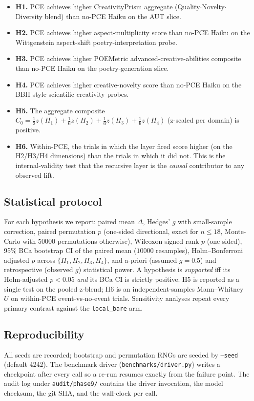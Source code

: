 \begin{itemize}[leftmargin=1.4em]
\item \textbf{H1.} PCE achieves higher CreativityPrism aggregate (Quality$\cdot$Novelty$\cdot$Diversity blend) than no-PCE Haiku on the AUT slice.
\item \textbf{H2.} PCE achieves higher aspect-multiplicity score than no-PCE Haiku on the Wittgenstein aspect-shift poetry-interpretation probe.
\item \textbf{H3.} PCE achieves higher POEMetric advanced-creative-abilities composite than no-PCE Haiku on the poetry-generation slice.
\item \textbf{H4.} PCE achieves higher creative-novelty score than no-PCE Haiku on the BBH-style scientific-creativity probes.
\item \textbf{H5.} The aggregate composite $C_0 = \tfrac{1}{2} z(H_1) + \tfrac{1}{6} z(H_2) + \tfrac{1}{6} z(H_3) + \tfrac{1}{6} z(H_4)$ (z-scaled per domain) is positive.
\item \textbf{H6.} Within-PCE, the trials in which the  layer fired score higher (on the H2/H3/H4 dimensions) than the trials in which it did not. This is the internal-validity test that the recursive layer is the \emph{causal} contributor to any observed lift.
\end{itemize}

\subsection{Statistical protocol}

For each hypothesis we report: paired mean $\Delta$, Hedges' $g$ with small-sample correction, paired permutation $p$ (one-sided directional, exact for $n\le 18$, Monte-Carlo with $50000$ permutations otherwise), Wilcoxon signed-rank $p$ (one-sided), 95\% BCa bootstrap CI of the paired mean ($10000$ resamples), Holm--Bonferroni adjusted $p$ across $\{H_1, H_2, H_3, H_4\}$, and a-priori (assumed $g=0.5$) and retrospective (observed $g$) statistical power. A hypothesis is \emph{supported} iff its Holm-adjusted $p<0.05$ \emph{and} its BCa CI is strictly positive. H5 is reported as a single test on the pooled z-blend; H6 is an independent-samples Mann--Whitney $U$ on within-PCE event-vs-no-event trials. Sensitivity analyses repeat every primary contrast against the \texttt{local\_bare} arm.

\subsection{Reproducibility}

All seeds are recorded; bootstrap and permutation RNGs are seeded by \texttt{--seed} (default 4242). The benchmark driver (\texttt{benchmarks/driver.py}) writes a checkpoint after every call so a re-run resumes exactly from the failure point. The audit log under \texttt{audit/phase9/} contains the driver invocation, the model checksum, the git SHA, and the wall-clock per call.
